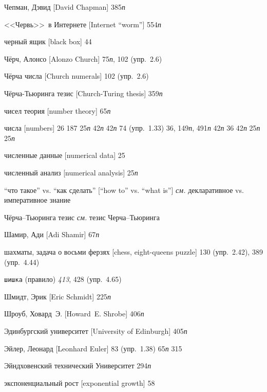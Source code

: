 \begin{theindex}
\item {Чепман, Дэвид [David Chapman]} 385{\it п}
\item {<<Червь>>~в Интернете [Internet ``worm'']} 554{\it п}
\item {черный ящик [black box]} 44
\item {Ч\"ерч, Алонсо [Alonzo Church]} 75{\it п}, 102 (упр.~2.6)
\item {Ч\"ерча числа [Church numerals]} 102 (упр.~2.6)
\item {Ч\"ерча-Тьюринга тезис [Church-Turing thesis]} 359{\it п}
\item {чисел теория [number theory]} 65{\it п}
\item {числа [numbers]}
   26
   187
   25{\it п}
   42{\it п}
   42{\it п}
   74 (упр.~1.33)
   36, 149{\it п}, 491{\it п}
   42{\it п}
   36
   42{\it п}
   25{\it п}
   25{\it п}
\item {численные данные [numerical data]} 25
\item {численный анализ [numerical analysis]} 25{\it п}
\item {``что такое'' vs. ``как сделать'' [``how to'' vs. ``what is'']} {\it см.} декларативное vs. императивное знание
\item {Чёрча--Тьюринга тезис} {\it см.} тезис  Черча--Тьюринга
\bigskip
\item {Шамир, Ади [Adi Shamir]} 67{\it п}
\item {шахматы, задача о восьми ферзях [chess, eight-queens puzzle]} 130 (упр.~2.42), 389 (упр.~4.44)
\item {\texttt{шишка} (правило)} {\it 413}, 428 (упр.~4.65)
\item {Шмидт, Эрик [Eric Schmidt]} 225{\it п}
\item {Шроуб, Ховард~Э. [Howard~E. Shrobe]} 406{\it п}
\bigskip
\item {Эдинбургский университет [University of Edinburgh]} 405{\it п}
\item {Эйлер, Леонард [Leonhard Euler]} 83 (упр.~1.38)
   65{\it п}
   315
\item {Эйндховенский технический Университет} 294{\it п}
\item {экспоненциальный рост [exponential growth]} 58

\end{theindex}
